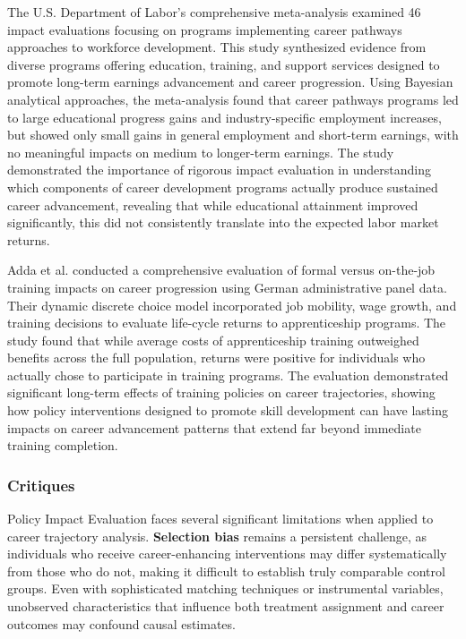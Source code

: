 \documentclass[main.tex]{subfiles}
\begin{document}

The U.S. Department of Labor's comprehensive meta-analysis examined 46 impact evaluations focusing on programs implementing career pathways approaches to workforce development\parencite{career_pathways_meta}. This study synthesized evidence from diverse programs offering education, training, and support services designed to promote long-term earnings advancement and career progression. Using Bayesian analytical approaches, the meta-analysis found that career pathways programs led to large educational progress gains and industry-specific employment increases, but showed only small gains in general employment and short-term earnings, with no meaningful impacts on medium to longer-term earnings. The study demonstrated the importance of rigorous impact evaluation in understanding which components of career development programs actually produce sustained career advancement, revealing that while educational attainment improved significantly, this did not consistently translate into the expected labor market returns.


Adda et al. conducted a comprehensive evaluation of formal versus on-the-job training impacts on career progression using German administrative panel data\parencite{career_training}. Their dynamic discrete choice model incorporated job mobility, wage growth, and training decisions to evaluate life-cycle returns to apprenticeship programs. The study found that while average costs of apprenticeship training outweighed benefits across the full population, returns were positive for individuals who actually chose to participate in training programs. The evaluation demonstrated significant long-term effects of training policies on career trajectories, showing how policy interventions designed to promote skill development can have lasting impacts on career advancement patterns that extend far beyond immediate training completion.

\subsubsection{Critiques}

Policy Impact Evaluation faces several significant limitations when applied to career trajectory analysis\parencite{quasi_exp_worldbank,quasi_experimental}. \textbf{Selection bias} remains a persistent challenge, as individuals who receive career-enhancing interventions may differ systematically from those who do not, making it difficult to establish truly comparable control groups\parencite{quasi_exp_worldbank}. Even with sophisticated matching techniques or instrumental variables, unobserved characteristics that influence both treatment assignment and career outcomes may confound causal estimates\parencite{causal_inference_book}.
\end{document}
